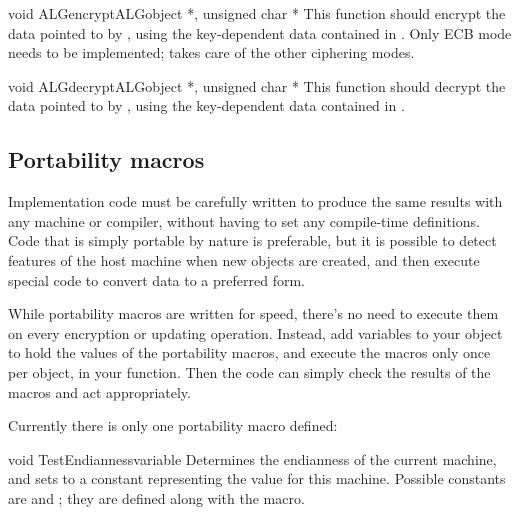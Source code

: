 \documentclass{howto}
\begin{document}
\begin{funcdesc}{void ALGencrypt}{\rm ALGobject *, unsigned char *}
This function should encrypt the data pointed to by , using
the key-dependent data contained in .  Only ECB mode needs
to be implemented;  takes care of the other
ciphering modes.
\end{funcdesc}

\begin{funcdesc}{void ALGdecrypt}{\rm ALGobject *, unsigned char *}
This function should decrypt the data pointed to by , using
the key-dependent data contained in .
\end{funcdesc}

\subsection{Portability macros}

Implementation code must be carefully written to produce the same
results with any machine or compiler, without having to set any
compile-time definitions.  Code that is simply portable by nature is
preferable, but it is possible to detect features of the host machine
when new objects are created, and then execute special code to convert
data to a preferred form.

While portability macros are written for speed, there's no need to
execute them on every encryption or updating operation.  Instead, add
variables to your object to hold the values of the portability macros,
and execute the macros only once per object, in your
 function.  Then the code can simply check the
results of the macros and act appropriately.

Currently there is only one portability macro defined:

\begin{funcdesc}{void TestEndianness}{variable}
Determines the endianness of the current machine, and sets
 to a constant representing the value for this machine.
Possible constants are  and ;
they are defined along with the  macro.
\end{funcdesc}
\end{document}
